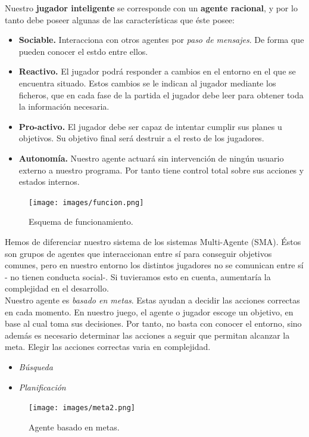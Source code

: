 \documentclass[a4paper,12pt,oneside]{book}
\begin{document}
Nuestro {\bf jugador inteligente} se corresponde con un {\bf agente racional}, y
por lo tanto debe poseer algunas de las características que éste posee:
\begin{itemize}
\item {\bf Sociable.} Interacciona con otros agentes por {\it paso de
    mensajes}. De forma que pueden conocer el estdo entre ellos.
\item {\bf Reactivo.} El jugador podrá responder a cambios en el
  entorno en el que se encuentra situado. Estos cambios se le indican
  al jugador mediante los ficheros, que en cada fase de la partida el
  jugador debe leer para obtener toda la información necesaria.
\item {\bf Pro-activo.} El jugador debe ser capaz de intentar cumplir
  sus planes u objetivos. Su objetivo final será destruir a el resto
  de los jugadores.
\item {\bf Autonomía.} Nuestro agente actuará sin intervención de
  ningún usuario externo a nuestro programa. Por tanto tiene control
  total sobre sus acciones y estados internos.
\end{itemize}


\begin{figure}[!h]
  \centering
  \texttt{[image: images/funcion.png]}
  \caption{Esquema de funcionamiento.}
\end{figure}


Hemos de diferenciar nuestro sistema de los sistemas Multi-Agente
(SMA). Éstos son grupos de agentes que interaccionan entre sí para
conseguir objetivos comunes, pero en nuestro entorno los distintos
jugadores no se comunican entre sí - no tienen conducta social-. Si
tuvieramos esto en cuenta, aumentaría la complejidad en el
desarrollo.\\

Nuestro agente es {\it basado en metas}. Estas ayudan a decidir las acciones
correctas en cada momento. En nuestro juego, el agente o jugador
escoge un objetivo, en base al cual toma sus decisiones. Por tanto, no
basta con conocer el entorno, sino además es necesario determinar las
acciones a seguir que permitan alcanzar la meta. Elegir las acciones
correctas varia en complejidad.
\begin{itemize}
\item {\it Búsqueda}
\item {\it Planificación}
\end{itemize}
\begin{figure}[!h]
  \centering
  \texttt{[image: images/meta2.png]}
  \caption{Agente basado en metas.}
\end{figure}
\end{document}

